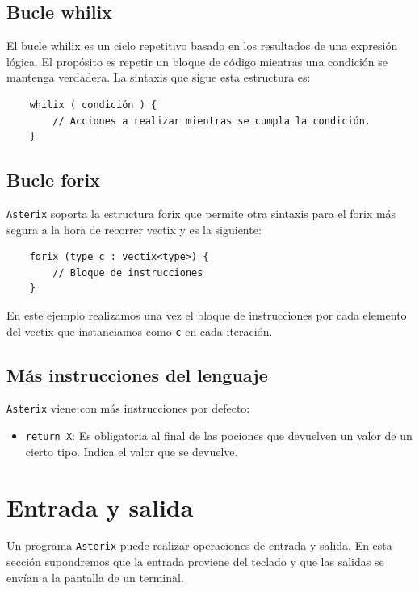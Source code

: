 \documentclass[a4paper, 10pt]{article}
\newcommand{\atx}{\texttt{Asterix} }
\begin{document}
    \subsection*{Bucle whilix}
    El bucle whilix es un ciclo repetitivo basado en los resultados
    de una expresión lógica. El propósito es repetir un bloque de código
    mientras una condición se mantenga verdadera. La sintaxis que sigue esta
    estructura es:

    \begin{verbatim}
    whilix ( condición ) {
        // Acciones a realizar mientras se cumpla la condición.
    }
    \end{verbatim}
    
    \subsection*{Bucle forix}
    \atx soporta la estructura \textsf{forix} que permite otra sintaxis para el
    forix más segura a la hora de recorrer vectix y es la siguiente:

    \begin{verbatim}
    forix (type c : vectix<type>) {
        // Bloque de instrucciones
    }
    \end{verbatim}

    En este ejemplo realizamos una vez el bloque de instrucciones por cada
    elemento del vectix que instanciamos como \texttt{c} en cada iteración.
    
    \subsection*{Más instrucciones del lenguaje}
    \atx viene con más instrucciones por defecto:
    \begin{itemize}
        \item \texttt{return X}: Es obligatoria al final de las pociones que 
            devuelven un valor de un cierto tipo. Indica el valor que se devuelve.
    \end{itemize}  
    
    \section*{Entrada y salida}
    
    Un programa \atx puede realizar operaciones de entrada y salida. En esta
    sección supondremos que la entrada proviene del teclado y que las salidas
    se envían a la pantalla de un terminal.
    
\end{document}
